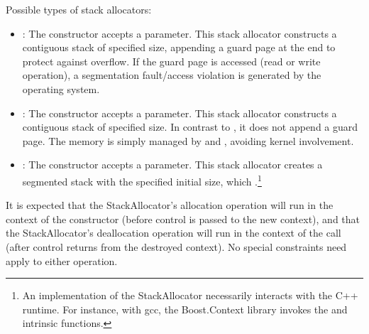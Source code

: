 Possible types of stack allocators:
\begin{itemize}
    \item {}: The constructor accepts a 
          parameter. This stack allocator constructs a contiguous stack of
          specified size, appending a guard page at the end to protect against
          overflow. If the guard page is accessed (read or write operation), a
          segmentation fault/access violation is generated by the operating
          system.
    \item {}: The constructor accepts a  parameter.
          This stack allocator constructs a contiguous stack of specified size.
          In contrast to , it does not append a guard
          page. The memory is simply managed by 
          and , avoiding kernel involvement.
    \item {}: The constructor accepts a  parameter.
          This stack allocator creates a segmented stack\cite{gccsplit} with the
          specified initial size, which .\footnote{An
          implementation of the  StackAllocator necessarily
          interacts with the C++ runtime. For instance, with gcc, the
          Boost.Context\cite{bcontext} library invokes
          the 
          and  intrinsic
          functions.\cite{splitalloc}}
\end{itemize}

It is expected that the StackAllocator's allocation operation will run in the
context of the constructor (before control is passed to the new context), and
that the StackAllocator's deallocation operation will run in the context of
the \dtor call (after control returns from the destroyed
context). No special constraints need apply to either operation.
